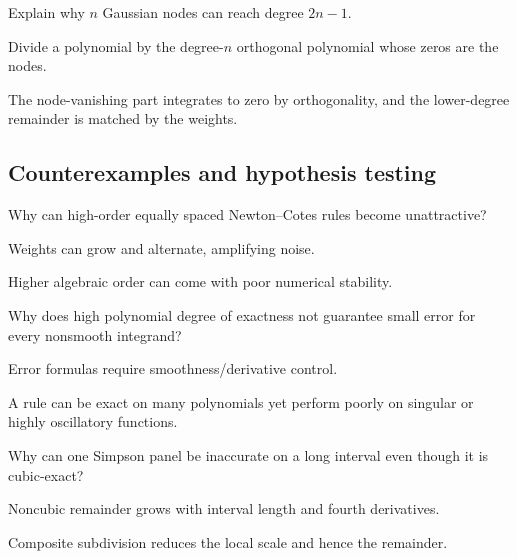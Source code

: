 \begin{exercise}\label{exr:ii24-expand-09}
Explain why \(n\) Gaussian nodes can reach degree \(2n-1\).
\end{exercise}
\begin{hint}
Divide a polynomial by the degree-\(n\) orthogonal polynomial whose zeros are the nodes.
\end{hint}
\begin{solution}
The node-vanishing part integrates to zero by orthogonality, and the lower-degree remainder is matched by the weights.
\end{solution}

\subsection*{Counterexamples and hypothesis testing}

\begin{exercise}\label{exr:ii24-expand-10}
Why can high-order equally spaced Newton--Cotes rules become unattractive?
\end{exercise}
\begin{hint}
Weights can grow and alternate, amplifying noise.
\end{hint}
\begin{solution}
Higher algebraic order can come with poor numerical stability.
\end{solution}

\begin{exercise}\label{exr:ii24-expand-11}
Why does high polynomial degree of exactness not guarantee small error for every nonsmooth integrand?
\end{exercise}
\begin{hint}
Error formulas require smoothness/derivative control.
\end{hint}
\begin{solution}
A rule can be exact on many polynomials yet perform poorly on singular or highly oscillatory functions.
\end{solution}

\begin{exercise}\label{exr:ii24-expand-12}
Why can one Simpson panel be inaccurate on a long interval even though it is cubic-exact?
\end{exercise}
\begin{hint}
Noncubic remainder grows with interval length and fourth derivatives.
\end{hint}
\begin{solution}
Composite subdivision reduces the local scale and hence the remainder.
\end{solution}

